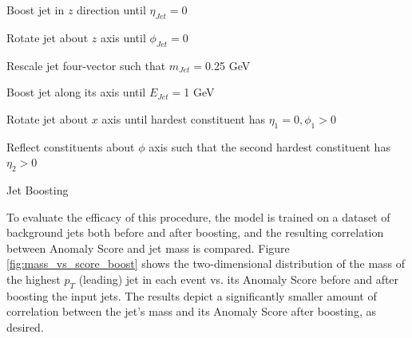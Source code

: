 \documentclass[11pt, a4paper]{article}
\begin{document}
\begin{algorithm}[H]
\SetAlgoLined
{}
  \Beginning{}

  Boost jet in $z$ direction until $\eta_{Jet} = 0$
 
  Rotate jet about $z$ axis until $\phi_{Jet} = 0$
 
  Rescale jet four-vector such that $m_{Jet} = $0.25 GeV
 
  Boost jet along its axis until $E_{Jet} = $1 GeV
 
  Rotate jet about $x$ axis until hardest constituent has $\eta_{1} = 0, \phi_{1} > 0$
 
 
 

 
Reflect constituents about $\phi$ axis such that the second hardest constituent has $\eta_{2} > 0$
 
\caption{Jet Boosting}
\label{alg:boost}
\end{algorithm}





To evaluate the efficacy of this procedure, the model is trained on a dataset of background jets both before and after boosting, and the resulting correlation between Anomaly Score and jet mass is compared. Figure \ref{fig:mass_vs_score_boost} shows the two-dimensional distribution of the mass of the highest $p_T$ (leading) jet in each event vs. its Anomaly Score before and after boosting the input jets. The results depict a significantly smaller amount of correlation between the jet's mass and its Anomaly Score after boosting, as desired.
\end{document}
